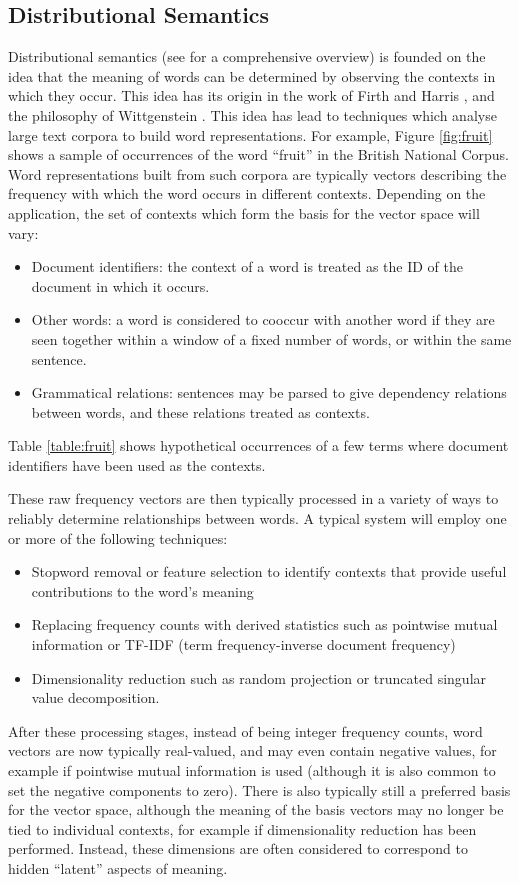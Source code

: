 \documentclass[journal,draftcls,onecolumn]{IEEEtran}
\theoremstyle{definition}
\begin{document}
\subsection{Distributional Semantics}

Distributional semantics (see \cite{Turney:10} for a comprehensive
overview) is founded on the idea that the meaning of words can be
determined by observing the contexts in which they occur. This idea
has its origin in the work of Firth \cite{Firth:57} and Harris
\cite{Harris:68}, and the philosophy of Wittgenstein
\cite{Wittgenstein:53}. This idea has lead to techniques which analyse
large text corpora to build word representations. For example, Figure
\ref{fig:fruit} shows a sample of occurrences of the word ``fruit'' in
the British National Corpus. Word representations built from such
corpora are typically vectors describing the frequency with which the
word occurs in different contexts. Depending on the application, the
set of contexts which form the basis for the vector space will vary:
\begin{itemize}
\item Document identifiers: the context of a word is treated as the ID
  of the document in which it occurs.
\item Other words: a word is considered to cooccur with another word
  if they are seen together within a window of a fixed number of
  words, or within the same sentence.
\item Grammatical relations: sentences may be parsed to give
  dependency relations between words, and these relations treated as
  contexts.
\end{itemize}
Table \ref{table:fruit} shows hypothetical occurrences of a few terms
where document identifiers have been used as the contexts.

These raw frequency vectors are then typically processed in a variety
of ways to reliably determine relationships between words. A typical
system will employ one or more of the following techniques:
\begin{itemize}
\item Stopword removal or feature selection to identify contexts that
  provide useful contributions to the word's meaning
\item Replacing frequency counts with derived statistics such as
  pointwise mutual information or TF-IDF (term frequency-inverse
  document frequency)
\item Dimensionality reduction such as random projection or truncated
  singular value decomposition.
\end{itemize}
After these processing stages, instead of being integer frequency
counts, word vectors are now typically real-valued, and may even
contain negative values, for example if pointwise mutual information
is used (although it is also common to set the negative components to
zero). There is also typically still a preferred basis for the vector
space, although the meaning of the basis vectors may no longer be tied
to individual contexts, for example if dimensionality reduction has
been performed. Instead, these dimensions are often considered to
correspond to hidden ``latent'' aspects of meaning.
\end{document}
